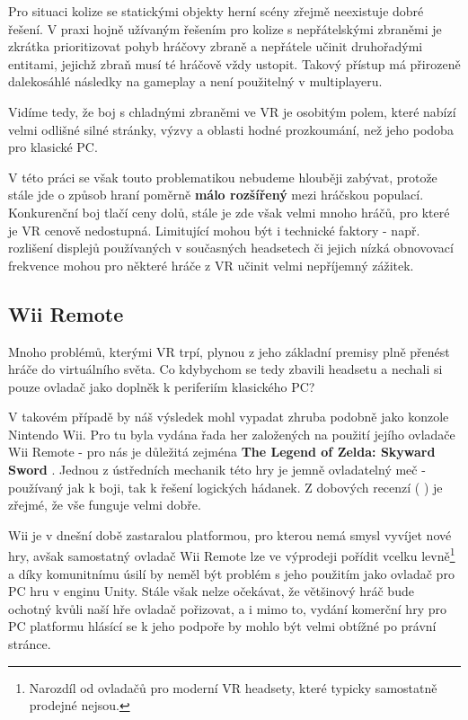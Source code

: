 Pro situaci kolize se statickými objekty herní scény zřejmě neexistuje dobré řešení. V praxi hojně užívaným řešením pro kolize s nepřátelskými zbraněmi je zkrátka prioritizovat pohyb hráčovy zbraně a nepřátele učinit druhořadými entitami, jejichž zbraň musí té hráčově vždy ustopit. Takový přístup má přirozeně dalekosáhlé následky na gameplay a není použitelný v multiplayeru. 

Vidíme tedy, že boj s chladnými zbraněmi ve \acs{VR} je osobitým polem, které nabízí velmi odlišné silné stránky, výzvy a oblasti hodné prozkoumání, než jeho podoba pro klasické PC.

V této práci se však touto problematikou nebudeme hlouběji zabývat, protože stále jde o způsob hraní poměrně \textbf{málo rozšířený} mezi hráčskou populací. Konkurenční boj tlačí ceny dolů, stále je zde však velmi mnoho hráčů, pro které je \acs{VR} cenově nedostupná. Limitující mohou být i technické faktory - např. rozlišení displejů používaných v současných headsetech či jejich nízká obnovovací frekvence mohou pro některé hráče z \acs{VR} učinit velmi nepříjemný zážitek. 

\subsection{Wii Remote} \label{wiiRemoteSubsection}

Mnoho problémů, kterými \acs{VR} trpí, plynou z jeho základní premisy plně přenést hráče do virtuálního světa. Co kdybychom se tedy zbavili headsetu a nechali si pouze ovladač jako doplněk k periferiím klasického PC?

V takovém případě by náš výsledek mohl vypadat zhruba podobně jako konzole Nintendo Wii. Pro tu byla vydána řada her založených na použití jejího ovladače Wii Remote - pro nás je důležitá zejména \textbf{The Legend of Zelda: Skyward Sword} \cite{ZeldaSkywardSword}. Jednou z ústředních mechanik této hry je jemně ovladatelný meč - používaný jak k boji, tak k řešení logických hádanek. Z dobových recenzí (\cite{SkywardReviewNintendolife} \cite{SkywardReviewIgn}) je zřejmé, že vše funguje velmi dobře. 

Wii je v dnešní době zastaralou platformou, pro kterou nemá smysl vyvíjet nové hry, avšak samostatný ovladač Wii Remote lze ve výprodeji pořídit vcelku levně\footnote{Narozdíl od ovladačů pro moderní \acs{VR} headsety, které typicky samostatně prodejné nejsou.} a díky komunitnímu úsilí \cite{WiiRemoteUnityAPI} by neměl být problém s jeho použitím jako ovladač pro PC hru v enginu Unity. Stále však nelze očekávat, že většinový hráč bude ochotný kvůli naší hře ovladač pořizovat, a i mimo to, vydání komerční hry pro PC platformu hlásící se k jeho podpoře by mohlo být velmi obtížné po právní stránce.


